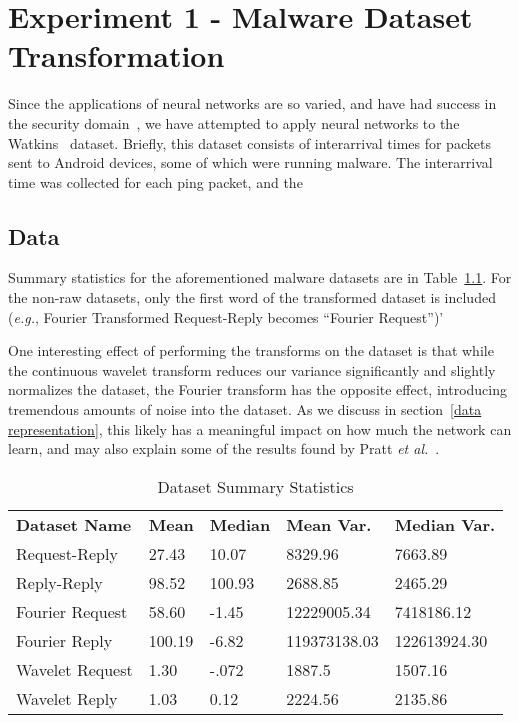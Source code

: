 \chapter{Experiment 1 - Malware Dataset Transformation}
\label{chap:three}

Since the applications of neural networks are so varied, and have had success in the security domain~\cite{raff2018malware}, we have attempted to apply neural networks to the Watkins~\cite{watkins2013using} dataset.
Briefly, this dataset consists of interarrival times for packets sent to Android devices, some of which were running malware.
The interarrival time was collected for each ping packet, and the 

\section{Data}
Summary statistics for the aforementioned malware datasets are in Table~\ref{Tab:summary}. 
For the non-raw datasets, only the first word of the transformed dataset is included (\textit{e.g.}, Fourier Transformed Request-Reply becomes ``Fourier Request'')'

One interesting effect of performing the transforms on the dataset is that while the continuous wavelet transform reduces our variance significantly and slightly normalizes the dataset, the Fourier transform has the opposite effect, introducing tremendous amounts of noise into the dataset.
As we discuss in section~\ref{data representation}, this likely has a meaningful impact on how much the network can learn, and may also explain some of the results found by Pratt \textit{et al.}~\cite{pratt2017fcnn}.

\renewcommand{\thefootnote}{*} 
\begin{table}[h]
\caption{Dataset Summary Statistics}
\centering
\label{Tab:summary}	
\begin{tabular}{l|llll}
\textbf{Dataset Name} & \textbf{Mean} & \textbf{Median} & \textbf{Mean Var.} & \textbf{Median Var.} \\\cline{1-5}
Request-Reply         & 27.43    & 10.07    & 8329.96    & 7663.89 \\
Reply-Reply           & 98.52    & 100.93   & 2688.85    & 2465.29 \\
Fourier Request       & 58.60\footnotemark    & -1.45    & 12229005.34    & 7418186.12 \\
Fourier Reply         & 100.19\footnotemark    & -6.82    & 119373138.03    & 122613924.30 \\
Wavelet Request       & 1.30    & -.072    & 1887.5    & 1507.16 \\
Wavelet Reply         & 1.03    & 0.12    & 2224.56    & 2135.86                 
\end{tabular}
\end{table}

